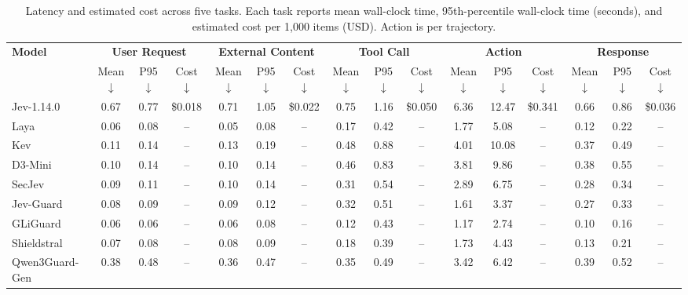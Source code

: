 \begin{table}[t]
    \centering
    \scriptsize
    \setlength{\tabcolsep}{1.0pt}
    \caption{Latency and estimated cost across five tasks. Each task reports mean wall-clock time, 95th-percentile wall-clock time (seconds), and estimated cost per 1,000 items (USD). Action is per trajectory.}
    \label{tab:rq2_cost_latency}
    \begin{tabular*}{\textwidth}{@{\extracolsep{\fill}}l*{15}{c}@{}}
        \toprule
        \multirow{2}{*}{\textbf{Model}}
        & \multicolumn{3}{c}{\textbf{User Request}}
        & \multicolumn{3}{c}{\textbf{External Content}}
        & \multicolumn{3}{c}{\textbf{Tool Call}}
        & \multicolumn{3}{c}{\textbf{Action}}
        & \multicolumn{3}{c}{\textbf{Response}} \\
        \cmidrule(lr){2-4} \cmidrule(lr){5-7} \cmidrule(lr){8-10}
        \cmidrule(lr){11-13} \cmidrule(lr){14-16}
        & Mean$\downarrow$ & P95$\downarrow$ & Cost$\downarrow$ & Mean$\downarrow$ & P95$\downarrow$ & Cost$\downarrow$ & Mean$\downarrow$ & P95$\downarrow$ & Cost$\downarrow$ & Mean$\downarrow$ & P95$\downarrow$ & Cost$\downarrow$ & Mean$\downarrow$ & P95$\downarrow$ & Cost$\downarrow$ \\
        \midrule
        Jev-1.14.0 & 0.67 & 0.77 & \$0.018 & 0.71 & 1.05 & \$0.022 & 0.75 & 1.16 & \$0.050 & 6.36 & 12.47 & \$0.341 & 0.66 & 0.86 & \$0.036 \\
        Laya & 0.06 & 0.08 & -- & 0.05 & 0.08 & -- & 0.17 & 0.42 & -- & 1.77 & 5.08 & -- & 0.12 & 0.22 & -- \\
        Kev & 0.11 & 0.14 & -- & 0.13 & 0.19 & -- & 0.48 & 0.88 & -- & 4.01 & 10.08 & -- & 0.37 & 0.49 & -- \\
        D3-Mini & 0.10 & 0.14 & -- & 0.10 & 0.14 & -- & 0.46 & 0.83 & -- & 3.81 & 9.86 & -- & 0.38 & 0.55 & -- \\
        SecJev & 0.09 & 0.11 & -- & 0.10 & 0.14 & -- & 0.31 & 0.54 & -- & 2.89 & 6.75 & -- & 0.28 & 0.34 & -- \\
        Jev-Guard & 0.08 & 0.09 & -- & 0.09 & 0.12 & -- & 0.32 & 0.51 & -- & 1.61 & 3.37 & -- & 0.27 & 0.33 & -- \\
        GLiGuard & 0.06 & 0.06 & -- & 0.06 & 0.08 & -- & 0.12 & 0.43 & -- & 1.17 & 2.74 & -- & 0.10 & 0.16 & -- \\
        Shieldstral & 0.07 & 0.08 & -- & 0.08 & 0.09 & -- & 0.18 & 0.39 & -- & 1.73 & 4.43 & -- & 0.13 & 0.21 & -- \\
        Qwen3Guard-Gen & 0.38 & 0.48 & -- & 0.36 & 0.47 & -- & 0.35 & 0.49 & -- & 3.42 & 6.42 & -- & 0.39 & 0.52 & -- \\

\end{tabular*}
\end{table}
